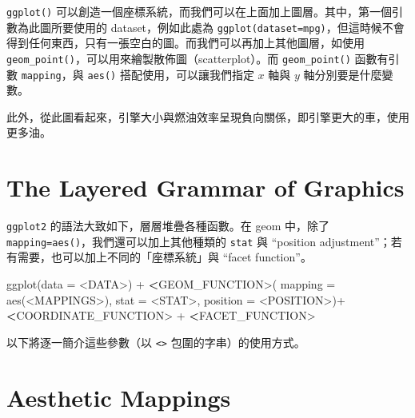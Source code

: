 \documentclass[
]{book}
\newenvironment{Shaded}{\begin{snugshade}}{\end{snugshade}}
\newcommand{\AttributeTok}[1]{\textcolor[rgb]{0.77,0.63,0.00}{#1}}
\newcommand{\ErrorTok}[1]{\textcolor[rgb]{0.64,0.00,0.00}{\textbf{#1}}}
\newcommand{\FunctionTok}[1]{\textcolor[rgb]{0.00,0.00,0.00}{#1}}
\newcommand{\NormalTok}[1]{#1}
\newcommand{\SpecialCharTok}[1]{\textcolor[rgb]{0.00,0.00,0.00}{#1}}
\theoremstyle{definition}
\theoremstyle{remark}
\begin{document}
\texttt{ggplot()} 可以創造一個座標系統，而我們可以在上面加上圖層。其中，第一個引數為此圖所要使用的 dataset，例如此處為 \texttt{ggplot(dataset=mpg)}，但這時候不會得到任何東西，只有一張空白的圖。而我們可以再加上其他圖層，如使用 \texttt{geom\_point()}，可以用來繪製散佈圖（scatterplot）。而 \texttt{geom\_point()} 函數有引數 \texttt{mapping}，與 \texttt{aes()} 搭配使用，可以讓我們指定 \(x\) 軸與 \(y\) 軸分別要是什麼變數。

此外，從此圖看起來，引擎大小與燃油效率呈現負向關係，即引擎更大的車，使用更多油。

\hypertarget{the-layered-grammar-of-graphics}{%
\section{The Layered Grammar of Graphics}\label{the-layered-grammar-of-graphics}}

\texttt{ggplot2} 的語法大致如下，層層堆疊各種函數。在 geom 中，除了 \texttt{mapping=aes()}，我們還可以加上其他種類的 \texttt{stat} 與 ``position adjustment''；若有需要，也可以加上不同的「座標系統」與 ``facet function''。

\begin{Shaded}
\begin{Highlighting}[]
\FunctionTok{ggplot}\NormalTok{(}\AttributeTok{data =} \SpecialCharTok{\textless{}}\NormalTok{DATA}\SpecialCharTok{\textgreater{}}\NormalTok{) }\SpecialCharTok{+} 
  \ErrorTok{\textless{}}\NormalTok{GEOM\_FUNCTION}\SpecialCharTok{\textgreater{}}\NormalTok{(}
    \AttributeTok{mapping =} \FunctionTok{aes}\NormalTok{(}\SpecialCharTok{\textless{}}\NormalTok{MAPPINGS}\SpecialCharTok{\textgreater{}}\NormalTok{),}
    \AttributeTok{stat =} \SpecialCharTok{\textless{}}\NormalTok{STAT}\SpecialCharTok{\textgreater{}}\NormalTok{,}
    \AttributeTok{position =} \SpecialCharTok{\textless{}}\NormalTok{POSITION}\SpecialCharTok{\textgreater{}}\NormalTok{)}\SpecialCharTok{+}
    \ErrorTok{\textless{}}\NormalTok{COORDINATE\_FUNCTION}\SpecialCharTok{\textgreater{}} \SpecialCharTok{+}
    \ErrorTok{\textless{}}\NormalTok{FACET\_FUNCTION}\SpecialCharTok{\textgreater{}}
\end{Highlighting}
\end{Shaded}

以下將逐一簡介這些參數（以 \texttt{\textless{}\textgreater{}} 包圍的字串）的使用方式。

\hypertarget{aesthetic-mappings}{%
\section{Aesthetic Mappings}\label{aesthetic-mappings}}
\end{document}
